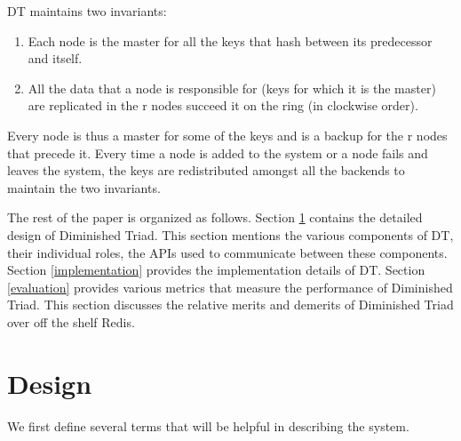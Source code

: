 \documentclass[10pt,twocolumn,letterpaper]{article}
\begin{document}
DT maintains two invariants:
\begin{enumerate}
  \item Each node is the master for all the keys that hash between its predecessor and itself.
  \item All the data that a node is responsible for (keys for which it is the master) are replicated in the r nodes succeed it on the ring (in clockwise order).
\end{enumerate}
Every node is thus a master for some of the keys and is a backup for the r nodes that precede it. Every time a node is added to the system or a node fails and leaves the system, the keys are redistributed amongst all the backends to maintain the two invariants.

The rest of the paper is organized as follows. Section \ref{design} contains the detailed design of Diminished Triad. This section mentions the various components of DT, their individual roles, the APIs used to communicate between these components. Section \ref{implementation} provides the implementation details of DT. Section \ref{evaluation} provides various metrics that measure the performance of Diminished Triad. This section discusses the relative merits and demerits of Diminished Triad over off the shelf Redis.


\section{Design} \label{design}
We first define several terms that will be helpful in describing the system. 
\end{document}

